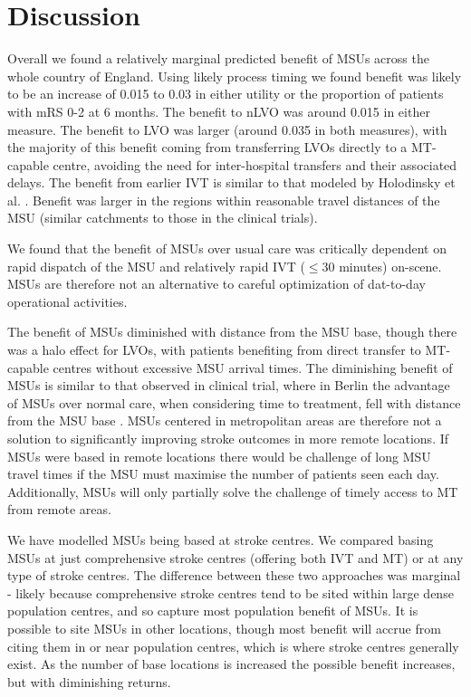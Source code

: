 \section{Discussion}



Overall we found a relatively marginal predicted benefit of MSUs across the whole country of England. Using likely process timing we found benefit was likely to be an increase of 0.015 to 0.03 in either utility or the proportion of patients with mRS 0-2 at 6 months. The benefit to nLVO was around 0.015 in either measure. The benefit to LVO was larger (around 0.035 in both measures), with the majority of this benefit coming from transferring LVOs directly to a MT-capable centre, avoiding the need for inter-hospital transfers and their associated delays. The benefit from earlier IVT is similar to that modeled by Holodinsky et al. \cite{holodinsky_jessalyn_k_what_2020}. Benefit was larger in the regions within reasonable travel distances of the MSU (similar catchments to those in the clinical trials). 

We found that the benefit of MSUs over usual care was critically dependent on rapid dispatch of the MSU and relatively rapid IVT ($\leq$30 minutes) on-scene. MSUs are therefore not an alternative to careful optimization of dat-to-day operational activities.

The benefit of MSUs diminished with distance from the MSU base, though there was a halo effect for LVOs, with patients benefiting from direct transfer to MT-capable centres without excessive MSU arrival times. The diminishing benefit of MSUs is similar to that observed in clinical trial, where in Berlin the advantage of MSUs over normal care, when considering time to treatment, fell with distance from the MSU base \cite{koch_influence_2016}. MSUs centered in metropolitan areas are therefore not a solution to significantly improving stroke outcomes in more remote locations. If MSUs were based in remote locations there would be challenge of long MSU travel times if the MSU must maximise the number of patients seen each day. Additionally, MSUs will only partially solve the challenge of timely access to MT from remote areas.

We have modelled MSUs  being based at stroke centres. We compared basing MSUs at just comprehensive stroke centres (offering both IVT and MT) or at any type of stroke centres. The difference between these two approaches was marginal - likely because comprehensive stroke centres tend to be sited within large dense population centres, and so capture most population benefit of MSUs. It is possible to site MSUs in other locations, though most benefit will accrue from citing them in or near population centres, which is where stroke centres generally exist. As the number of base locations is increased the possible benefit increases, but with diminishing returns.

